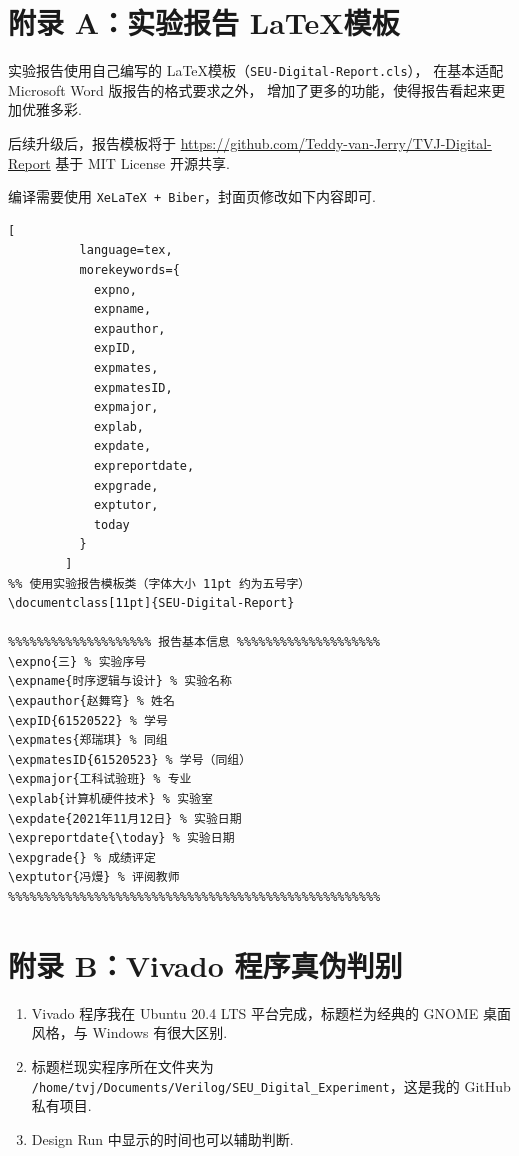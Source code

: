 \documentclass[11pt]{SEU-Digital-Report}
\begin{document}
    \printbibliography[sorting=none]

    \newpage
    \section*{附录 A：实验报告 \LaTeX 模板}

        实验报告使用自己编写的 \LaTeX 模板（\texttt{SEU-Digital-Report.cls}），
        在基本适配 Microsoft Word 版报告的格式要求之外，
        增加了更多的功能，使得报告看起来更加优雅多彩.

        后续升级后，报告模板将于 \url{https://github.com/Teddy-van-Jerry/TVJ-Digital-Report} 基于 MIT License 开源共享.

        编译需要使用 \texttt{XeLaTeX + Biber}，封面页修改如下内容即可.
        \begin{lstlisting}[
          language=tex,
          morekeywords={
            expno,
            expname,
            expauthor,
            expID,
            expmates,
            expmatesID,
            expmajor,
            explab,
            expdate,
            expreportdate,
            expgrade,
            exptutor,
            today
          }
        ]
%% 使用实验报告模板类（字体大小 11pt 约为五号字）
\documentclass[11pt]{SEU-Digital-Report}

%%%%%%%%%%%%%%%%%%%% 报告基本信息 %%%%%%%%%%%%%%%%%%%%
\expno{三} % 实验序号
\expname{时序逻辑与设计} % 实验名称
\expauthor{赵舞穹} % 姓名
\expID{61520522} % 学号
\expmates{郑瑞琪} % 同组
\expmatesID{61520523} % 学号（同组）
\expmajor{工科试验班} % 专业
\explab{计算机硬件技术} % 实验室
\expdate{2021年11月12日} % 实验日期
\expreportdate{\today} % 实验日期
\expgrade{} % 成绩评定
\exptutor{冯熳} % 评阅教师
%%%%%%%%%%%%%%%%%%%%%%%%%%%%%%%%%%%%%%%%%%%%%%%%%%%%
        \end{lstlisting}

    \section*{附录 B：Vivado 程序真伪判别}

    \begin{enumerate}
        \item Vivado 程序我在 Ubuntu 20.4 LTS 平台完成，标题栏为经典的 GNOME 桌面风格，与 Windows 有很大区别.
        \item 标题栏现实程序所在文件夹为 \texttt{/home/tvj/Documents/Verilog/SEU\_Digital\_Experiment}，这是我的 GitHub 私有项目.
        \item Design Run 中显示的时间也可以辅助判断.
    \end{enumerate}
\end{document}
